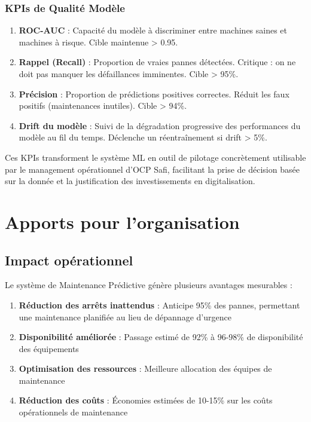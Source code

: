 \documentclass[a4paper,12pt,twoside]{report}
\begin{document}
\subsubsection{KPIs de Qualité Modèle}

\begin{enumerate}
    \item \textbf{ROC-AUC} : Capacité du modèle à discriminer entre machines saines et machines à risque. Cible maintenue > 0.95.
    
    \item \textbf{Rappel (Recall)} : Proportion de vraies pannes détectées. Critique : on ne doit pas manquer les défaillances imminentes. Cible > 95\%.
    
    \item \textbf{Précision} : Proportion de prédictions positives correctes. Réduit les faux positifs (maintenances inutiles). Cible > 94\%.
    
    \item \textbf{Drift du modèle} : Suivi de la dégradation progressive des performances du modèle au fil du temps. Déclenche un réentraînement si drift > 5\%.
\end{enumerate}

Ces KPIs transforment le système ML en outil de pilotage concrètement utilisable par le management opérationnel d'OCP Safi, facilitant la prise de décision basée sur la donnée et la justification des investissements en digitalisation.

\section{Apports pour l'organisation}

\subsection{Impact opérationnel}

Le système de Maintenance Prédictive génère plusieurs avantages mesurables :

\begin{enumerate}
    \item \textbf{Réduction des arrêts inattendus} : Anticipe 95\% des pannes, permettant une maintenance planifiée au lieu de dépannage d'urgence
    \item \textbf{Disponibilité améliorée} : Passage estimé de 92\% à 96-98\% de disponibilité des équipements
    \item \textbf{Optimisation des ressources} : Meilleure allocation des équipes de maintenance
    \item \textbf{Réduction des coûts} : Économies estimées de 10-15\% sur les coûts opérationnels de maintenance
\end{enumerate}
\end{document}
